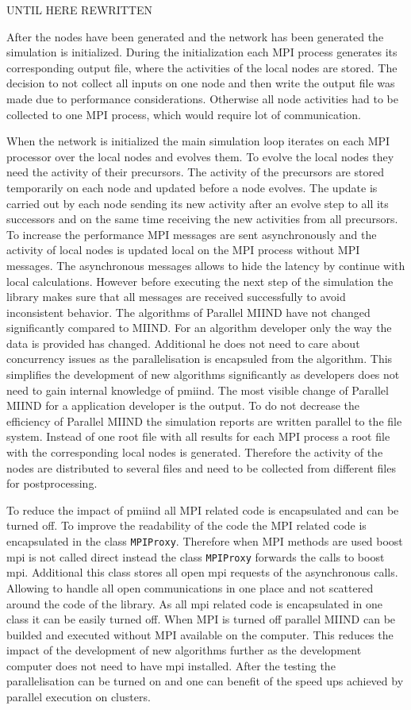 \documentclass[12pt]{article}
\begin{document}
UNTIL HERE REWRITTEN

After the nodes have been generated and the network has been generated the simulation is initialized. During the initialization each MPI process generates its corresponding output file, where the activities of the local nodes are stored. The decision to not collect all inputs on one node and then write the output file was made due to performance considerations. Otherwise all node activities had to be collected to one MPI process, which would require lot of communication.

When the network is initialized the main simulation loop iterates on each MPI processor over the local nodes and evolves them.
To evolve the local nodes they need the activity of their precursors.
The activity of the precursors are stored temporarily on each node and updated before a node evolves.
The update is carried out by each node sending its new activity after an evolve step to all its successors and on the same time receiving the new activities from all precursors.
To increase the performance MPI messages are sent asynchronously and the activity of local nodes is updated local on the MPI process without MPI messages.
The asynchronous messages allows to hide the latency by continue with local calculations.
However before executing the next step of the simulation the library makes sure that all messages are received successfully to avoid inconsistent behavior.
The algorithms of Parallel MIIND have not changed significantly compared to MIIND. For an algorithm developer only the way the data is provided has changed.
Additional he does not need to care about concurrency issues as the parallelisation is encapsuled from the algorithm.
This simplifies the development of new algorithms significantly as developers does not need to gain internal knowledge of pmiind.
The most visible change of Parallel MIIND for a application developer is the output.
To do not decrease the efficiency of Parallel MIIND the simulation reports are written parallel to the file system.
Instead of one root file with all results for each MPI process a root file with the corresponding local nodes is generated.
Therefore the activity of the nodes are distributed to several files and need to be collected from different files for postprocessing.

To reduce the impact of pmiind all MPI related code is encapsulated and can be turned off.
To improve the readability of the code the MPI related code is encapsulated in the class \texttt{MPIProxy}.
Therefore when MPI methods are used boost mpi is not called direct instead the class \texttt{MPIProxy} forwards the calls to boost mpi.
Additional this class stores all open mpi requests of the asynchronous calls.
Allowing to handle all open communications in one place and not scattered around the code of the library.
As all mpi related code is encapsulated in one class it can be easily turned off.
When MPI is turned off parallel MIIND can be builded and executed without MPI available on the computer.
This reduces the impact of the development of new algorithms further as the development computer does not need to have mpi installed.
After the testing the parallelisation can be turned on and one can benefit of the speed ups achieved by parallel execution on clusters.
\end{document}
